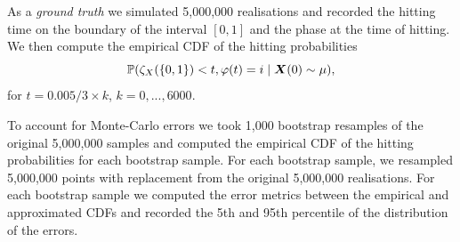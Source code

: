 As a \emph{ground truth} we simulated 5,000,000 realisations and recorded the hitting time on the boundary of the interval \([0,1]\) and the phase at the time of hitting. We then compute the empirical CDF of the hitting probabilities 
\[\mathbb P(\zeta_{X}(\{0,1\}) < t, \varphi(t)=i\mid \boldsymbol X(0)\sim \mu),\] 
for \(t=0.005/3\times k\), \(k=0,...,6000\). 

To account for Monte-Carlo errors we took 1,000 bootstrap resamples of the original 5,000,000 samples and computed the empirical CDF of the hitting probabilities for each bootstrap sample. For each bootstrap sample, we resampled 5,000,000 points with replacement from the original 5,000,000 realisations. For each bootstrap sample we computed the error metrics between the empirical and approximated CDFs and recorded the 5th and 95th percentile of the distribution of the errors. 

